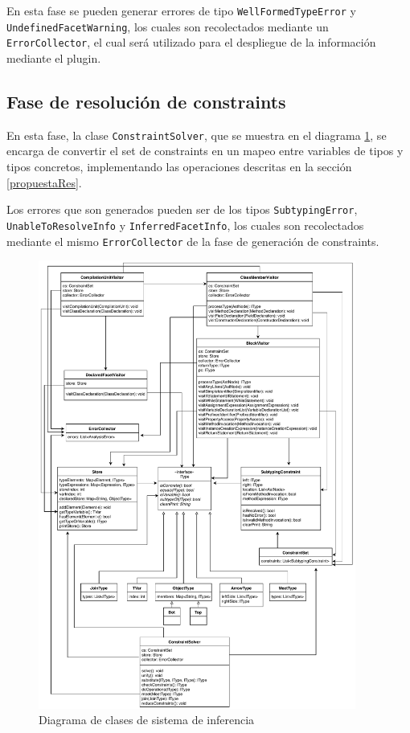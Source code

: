 En esta fase se pueden generar errores de tipo \texttt{WellFormedTypeError} y \texttt{UndefinedFacetWarning}, los cuales son recolectados mediante un \texttt{ErrorCollector}, el cual será utilizado para el despliegue de la información mediante el plugin.

\subsection{Fase de resolución de constraints}
En esta fase, la clase \texttt{ConstraintSolver}, que se muestra en el diagrama \ref{uml}, se encarga de convertir el set de constraints en un mapeo entre variables de tipos y tipos concretos, implementando las operaciones descritas en la sección \ref{propuestaRes}.

Los errores que son generados pueden ser de los tipos \texttt{SubtypingError}, \texttt{UnableToResolveInfo} y \texttt{InferredFacetInfo}, los cuales son recolectados mediante el mismo \texttt{ErrorCollector} de la fase de generación de constraints.

\begin{figure}[ht]
  \centering
  \includegraphics[width=0.93\textwidth]{imagenes/others.pdf}
  \caption{Diagrama de clases de sistema de inferencia}
  \label{uml}
\end{figure}
\clearpage

